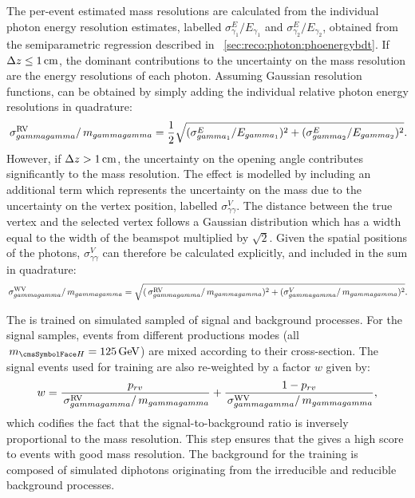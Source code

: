 The per-event estimated mass resolutions are calculated from the individual photon energy resolution estimates, labelled $\sigma^E_{\gamma_1}/E_{\gamma_1}$ and $\sigma^E_{\gamma_2}/E_{\gamma_2}$, obtained from the semiparametric regression \PhoEnergyBdt described in \Sec~\ref{sec:reco:photon:phoenergybdt}. If $\Delta z \leq 1\,\text{cm}$, the dominant contributions to the uncertainty on the mass resolution are the energy resolutions of each photon. Assuming Gaussian resolution functions, \sigmarv can be obtained by simply adding the individual relative photon energy resolutions in quadrature:
\begin{equation}
\,\sigma^\text{RV}_{gammagamma}/\,m_{gammagamma}= \frac{1}{2} \sqrt{({\sigma^E_{gamma_1}}/{E_{gamma_1}})^2 +({\sigma^E_{gamma_2}}/{E_{gamma_2}})^2 }.
\end{equation} 
However, if $\Delta z > 1\,\text{cm}$, the uncertainty on the opening angle contributes significantly to the mass resolution. The effect is modelled by including an additional term which represents the uncertainty on the mass due to the uncertainty on the vertex position, labelled $\sigma^V_{\gamma\gamma}$. The distance between the true vertex and the selected vertex follows a Gaussian distribution which has a width equal to the width of the beamspot multiplied by $\sqrt{2}$. Given the spatial positions of the photons, $\sigma^V_{\gamma\gamma}$ can therefore be calculated explicitly, and included in the sum in quadrature:
\begin{equation}
\,\sigma^\text{WV}_{gammagamma}/\,m_{gammagamma}= \sqrt{(\,\sigma^\text{RV}_{gammagamma}/\,m_{gammagamma})^2 +(\sigma^V_{gammagamma}/\,m_{gammagamma})^2 }.
\end{equation} 

The \DiPhoBdt is trained on simulated sampled of signal and background processes. For the signal samples, events from different productions modes (all $\mH=125\GeV$) are mixed according to their cross-section. The signal events used for training are also re-weighted by a factor $w$ given by: 
\begin{equation}
w= \frac{p_{rv}}{\,\sigma^\text{RV}_{gammagamma}/\,m_{gammagamma}}+\frac{1-p_{rv}}{\,\sigma^\text{WV}_{gammagamma}/\,m_{gammagamma}},
\end{equation} 
which codifies the fact that the signal-to-background ratio is inversely proportional to the mass resolution. This step ensures that the \DiPhoBdt gives a high score to events with good mass resolution.
The background for the training is composed of simulated diphotons originating from the irreducible and reducible \SM background processes. 


